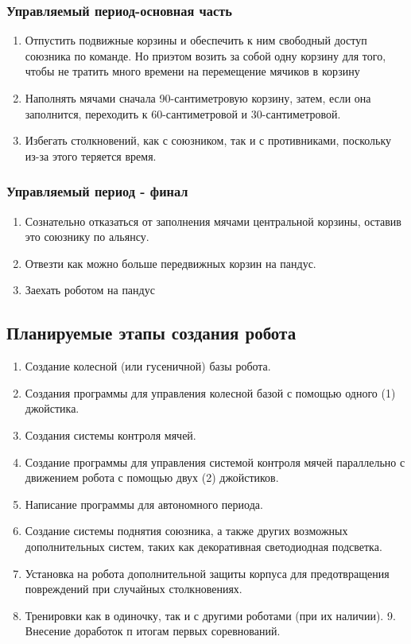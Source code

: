 \documentclass[12pt]{article}
\begin{document}
	      \subsubsection{Управляемый период-основная часть}
	      \begin{enumerate}
	      	\item Отпустить подвижные корзины и обеспечить к ним свободный доступ союзника по команде. Но приэтом возить за собой одну корзину для того, чтобы не тратить много времени на перемещение мячиков в корзину
	      	\item Наполнять мячами сначала 90-сантиметровую корзину, затем, если она заполнится, переходить к 60-сантиметровой и 30-сантиметровой.
	      	\item Избегать столкновений, как с союзником, так и с противниками, поскольку из-за этого теряется время.
	      \end{enumerate}
	      \subsubsection{Управляемый период - финал}
	      \begin{enumerate}
	      \item Сознательно отказаться от заполнения мячами центральной корзины, оставив это союзнику по альянсу.
	      \item Отвезти как можно больше передвижных корзин на пандус.
	      \item Заехать роботом на пандус 
	      \end{enumerate}
	      \subsection{Планируемые этапы создания робота}
	      \begin{enumerate}
	      	\item Создание колесной (или гусеничной) базы робота.
	      	\item Создания программы для управления колесной базой с помощью одного (1) джойстика.
	      	\item Создания системы контроля мячей.
	      	\item Создание программы для управления системой контроля мячей параллельно с движением робота с помощью двух (2) джойстиков.
	      	\item Написание программы для автономного периода.
	      	\item Создание системы поднятия союзника, а также других возможных дополнительных систем, таких как декоративная светодиодная подсветка.
	      	\item Установка на робота дополнительной защиты корпуса для предотвращения повреждений при случайных столкновениях.
	      	\item Тренировки как в одиночку, так и с другими роботами (при их наличии).
	      	9.	Внесение доработок п итогам первых соревнований.
	      \end{enumerate}
	      \newpage
\end{document}
